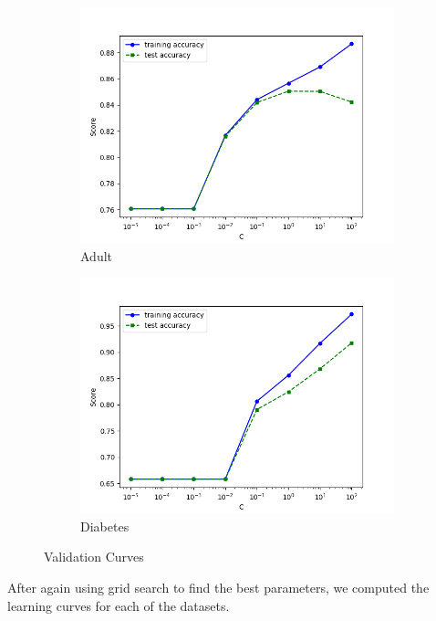 \documentclass[11pt, twocolumn]{article}
\begin{document}
    \begin{figure}[!htbp]
        \begin{subfigure}{.24\textwidth}
            \centering
            \includegraphics[width=.9\textwidth]{validations_Adult_SVC_RBF_C}
            \caption{Adult}
            \label{fig:validations_Adult_SVC_RBF_C}
        \end{subfigure}
        \begin{subfigure}{.24\textwidth}
            \centering
            \includegraphics[width=.9\textwidth]{validations_Diabetes_SVC_RBF_C}
            \caption{Diabetes}
            \label{fig:validations_Diabetes_SVC_RBF_C}
        \end{subfigure}
        \caption{Validation Curves}
    \end{figure}
    \FloatBarrier

    After again using grid search to find the best parameters, we computed the learning curves for each of the datasets.
\end{document}
